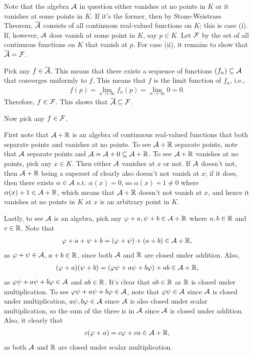 \documentclass[12pt]{article}
\begin{document}
\begin{fproof}[4]
Note that the algebra \(\mathcal{A}\) in question either vanishes at no points in \(K\) or it vanishes at some points in \(K\). If it's the former, then by Stone-Weistrass Theorem, \(\overline{\mathcal{A}}\) consists of all continuous real-valued functions on \(K\); this is case (i). If, however, \(\mathcal{A}\) does vanish at some point in \(K\), say \(p \in K\). Let \(\mathcal{F}\) by the set of all continuous functions on \(K\) that vanish at \(p\). For case (ii), it remains to show that \(\overline{\mathcal{A}} = \mathcal{F}\).

Pick any \(f \in \overline{\mathcal{A}}\).
This means that there exists a sequence of functions \((f_n) \subseteq \mathcal{A}\) that converges uniformly to \(f\).
This means that \(f\) is the limit function of \(f_n\), i.e.,
\begin{align*}
    f(p) = \lim_{n \to \infty} f_n(p) = \lim_{n \to \infty} 0 = 0.
\end{align*}
Therefore, \(f \in \mathcal{F}\).
This shows that \(\overline{\mathcal{A}} \subseteq \mathcal{F}\).

Now pick any \(f \in \mathcal{F}\).

First note that \(\mathcal{A} + \mathbb {R}\) is an algebra of continuous real-valued functions that both separate points and vanishes at no points.
To see \(\mathcal{A} + \mathbb {R}\) separate points, note that \(\mathcal{A}\) separate points and \(\mathcal{A} = \mathcal{A} + 0 \subseteq \mathcal{A} + \mathbb {R}\). 
To see \(\mathcal{A} + \mathbb {R}\) vanishes at no points, pick any \(x \in K\). Then either \(\mathcal{A}\) vanishes at \(x\) or not.
If \(\mathcal{A}\) doesn't not, then \(\mathcal{A} + \mathbb {R}\) being a superset of clearly also doesn't not vanish at \(x\); if it does, then there exists \(\alpha \in \mathcal{A}\) s.t. \(\alpha(x) = 0\), so \(\alpha(x) + 1 \neq 0\) where \(\alpha(x) + 1 \in \mathcal{A} + \mathbb {R}\), which means that \(\mathcal{A} + \mathbb {R}\) doesn't not vanish at \(x\), and hence it vanishes at no points in \(K\) at \(x\) is an arbitrary point in \(K\).

Lastly, to see \(\mathcal{A}\) is an algebra, pick any \(\varphi + a, \psi + b \in \mathcal{A} + \mathbb {R}\) where \(a,b \in \mathbb {R}\) and \(c \in \mathbb {R}\).
Note that
\begin{align*}
    \varphi + a + \psi + b = (\varphi + \psi) + (a + b) \in \mathcal{A} + \mathbb {R},
\end{align*}
as \(\varphi + \psi \in \mathcal{A}\), \(a+b \in \mathbb {R}\), since both \(\mathcal{A}\) and \(\mathbb {R}\) are closed under addition.
Also,
\begin{align*}
    (\varphi + a)(\psi + b) = (\varphi \psi + a \psi + b \varphi) + ab \in \mathcal{A} + \mathbb {R},
\end{align*}
as \(\varphi \psi + a \psi + b \varphi \in \mathcal{A}\) and \(ab \in \mathbb {R}\). It's clear that \(ab \in \mathbb {R}\) as \(\mathbb {R}\) is closed under multiplication. To see \(\varphi \psi + a \psi + b \varphi \in \mathcal{A}\), note that \(\varphi \psi \in \mathcal{A}\) since \(\mathcal{A}\) is closed under multiplication, \(a \psi, b \varphi \in \mathcal{A}\) since \(\mathcal{A}\) is also closed under scalar multiplication, so the sum of the three is in \(\mathcal{A}\) since \(\mathcal{A}\) is closed under addition.
Also, it clearly that
\begin{align*}
    c(\varphi + a) = c \varphi + ca \in \mathcal{A} + \mathbb {R},
\end{align*}
as both \(\mathcal{A}\) and \(\mathbb {R}\) are closed under scalar multiplication.


\end{fproof}
\end{document}
